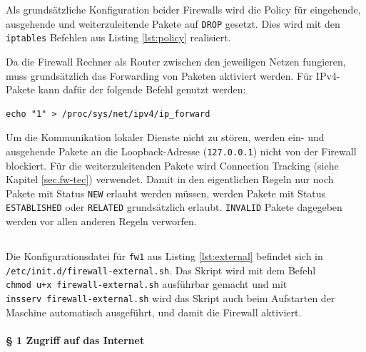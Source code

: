 \noindent Als grundsätzliche Konfiguration beider Firewalls wird die Policy für
eingehende, ausgehende und weiterzuleitende Pakete auf {\tt DROP} gesetzt.
Dies wird mit den {\tt iptables} Befehlen aus Listing \ref{lst:policy}
realisiert.



\noindent Da die Firewall Rechner als Router zwischen den jeweiligen Netzen
fungieren, muss grundsätzlich das Forwarding von Paketen aktiviert werden.
Für IPv4-Pakete kann dafür der folgende Befehl genutzt werden:

\begin{verbatim}
echo "1" > /proc/sys/net/ipv4/ip_forward
\end{verbatim}

\noindent Um die Kommunikation lokaler Dienste nicht zu stören, werden ein-
und ausgehende Pakete an die Loopback-Adresse ({\tt 127.0.0.1}) nicht von der
Firewall blockiert.
Für die weiterzuleitenden Pakete wird Connection Tracking
(siehe Kapitel \ref{sec.fw-tec}) verwendet.
Damit in den eigentlichen Regeln nur noch Pakete mit Status {\tt NEW} erlaubt
werden müssen, werden Pakete mit Status {\tt ESTABLISHED} oder {\tt RELATED}
grundsätzlich erlaubt.
{\tt INVALID} Pakete dagegeben werden vor allen anderen Regeln verworfen.




\subsection{\fwa}\label{sec.konfig.fwa}

Die Konfigurationsdatei für {\tt fw1} aus Listing \ref{lst:external}
befindet sich in\\
{\tt /etc/init.d/firewall-external.sh}.
Das Skript wird mit dem Befehl\\
{\tt chmod u+x firewall-external.sh}
ausführbar gemacht und mit\\
{\tt insserv firewall-external.sh}
wird das Skript auch beim Aufstarten der Maschine automatisch ausgeführt,
und damit die Firewall aktiviert.

\paragraph{§ 1 Zugriff auf das Internet}

